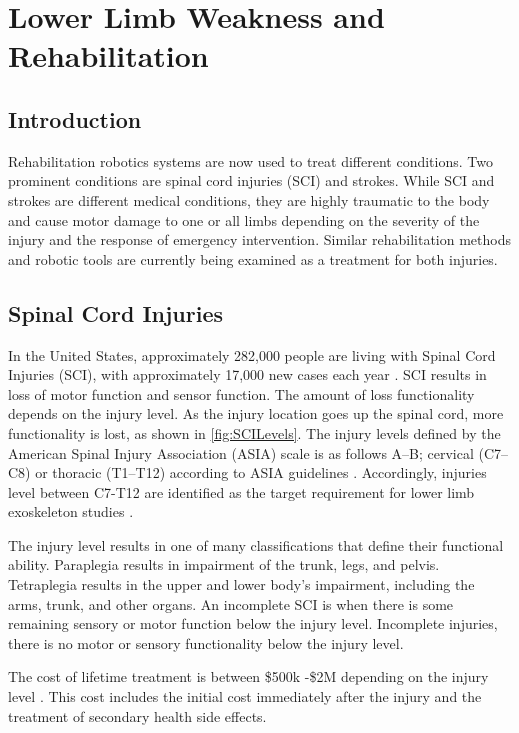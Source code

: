 \section{Lower Limb Weakness and Rehabilitation}
\subsection{Introduction}
Rehabilitation robotics systems are now used to treat different conditions. 
Two prominent conditions are spinal cord injuries (SCI) and strokes. While SCI and strokes are different medical conditions, they are highly traumatic to the body and cause motor damage to one or all limbs depending on the severity of the injury and the response of emergency intervention. Similar rehabilitation methods and robotic tools are currently being examined as a treatment for both injuries.  


\subsection{Spinal Cord Injuries}
In the United States, approximately 282,000 people are living with Spinal Cord Injuries (SCI), with approximately 17,000 new cases each year \cite{national2016facts}. SCI results in loss of motor function and sensor function. The amount of loss functionality depends on the injury level. As the injury location goes up the spinal cord, more functionality is lost, as shown in \autoref{fig:SCILevels}. The injury levels defined by the  American Spinal Injury Association (ASIA)  scale is as follows A–B; cervical (C7–C8) or thoracic (T1–T12) according to ASIA guidelines \cite{kirshblum2011international}. Accordingly, injuries level between C7-T12 are identified as the target requirement for lower limb exoskeleton studies \cite{esquenazi2012rewalk}. 

The injury level results in one of many classifications that define their functional ability. Paraplegia results in impairment of the trunk, legs, and pelvis. Tetraplegia results in the upper and lower body's impairment, including the arms, trunk, and other organs. An incomplete SCI is when there is some remaining sensory or motor function below the injury level.  Incomplete injuries, there is no motor or sensory functionality below the injury level. 

The cost of lifetime treatment is between \$500k -\$2M depending on the injury level \cite{mcdonald2002spinal}. This cost includes the initial cost immediately after the injury and the treatment of secondary health side effects.  

